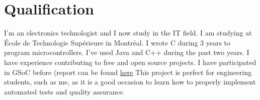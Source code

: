 \documentclass{article}
\begin{document}
\section{Qualification}
I'm an electronics technologist and I now study  in the IT field. I am studying at École de Technologie Supérieure in Montréal. I wrote C during 3 years to program microcontrollers. I’ve used Java and C++ during the past two years. I have experience contributing to free and open source projects. I have participated in GSoC before (report can be found
\href{https://gasuleg.github.io/gsoc2016/final\_report/2016/08/19/Final-Evaluation.html}{here}
This project is perfect for engineering students, such as me, as it is a good occasion to learn how to properly implement automated tests and quality assurance.
\end{document}
